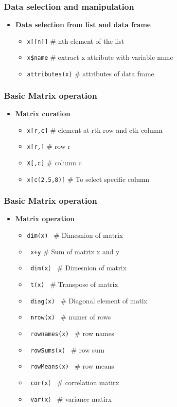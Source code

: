 \documentclass[12pt]{beamer}
\begin{document}
\begin{frame}[fragile]
\frametitle{Data selection and manipulation }
\begin{itemize}\justifying
	\item \textbf{Data selection from list and data frame}
	\begin{itemize}\justifying
		\item \verb|x[[n]]| \hfill \# nth element of the list
		\item  \verb|x$name| \hfill \#  extract x attribute with variable name
		\item  \verb|attributes(x)| \hfill \# attributes of data frame
	\end{itemize}
\end{itemize}
\end{frame}

\begin{frame}[fragile]
\frametitle{Basic Matrix operation }
\begin{itemize}\justifying
	\item \textbf{Matrix curation }
	\begin{itemize}\justifying
		\item \verb|x[r,c]| \hfill \# element at rth row and cth column
		\item  \verb|x[r,]| \hfill \#  row r
		\item  \verb|X[,c]| \hfill \# column c
		\item  \verb|x[c(2,5,8)]| \hfill \# To select specific column	
	\end{itemize}
\end{itemize}
\end{frame}

\begin{frame}[fragile]
\frametitle{Basic Matrix operation }
\begin{itemize}\justifying
	\item \textbf{Matrix operation }
	\begin{itemize}\justifying
		\item \verb|dim(x) | \hfill \# Dimesnion of matrix
		\item \verb| x+y| \hfill \# Sum of matrix x and y
		\item \verb| dim(x) | \hfill \# Dimesnion of matrix
		\item \verb| t(x) | \hfill \# Transpose of matrix
		\item \verb| diag(x) | \hfill \# Diagonal element of matix
		\item \verb| nrow(x) | \hfill \# numer of rows
		\item \verb| rownames(x) | \hfill \# row names
		\item \verb| rowSums(x) | \hfill \# row sum
		\item \verb| rowMeans(x) | \hfill \# row means
		\item \verb| cor(x) | \hfill \# correlation matirx
		\item \verb| var(x) | \hfill \# variance matirx		
	\end{itemize}
\end{itemize}
\end{frame}
\end{document}

